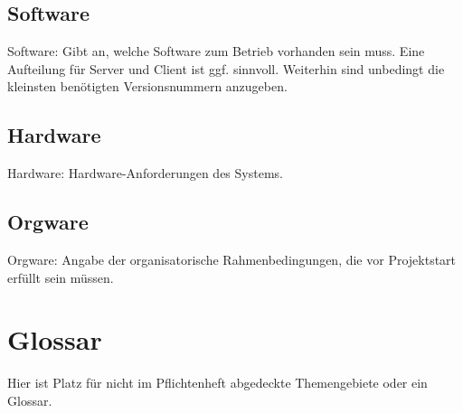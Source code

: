 \documentclass[a4paper]{scrreprt}
\begin{document}
\section{Software}
Software: Gibt an, welche Software zum Betrieb vorhanden sein muss. Eine
Aufteilung für Server und Client ist ggf. sinnvoll. Weiterhin sind unbedingt die
kleinsten benötigten Versionsnummern anzugeben.
 
\section{Hardware}
Hardware: Hardware-Anforderungen des Systems.
 
\section{Orgware}
Orgware: Angabe der organisatorische Rahmenbedingungen, die vor Projektstart
erfüllt sein müssen.
 
 
\chapter{Glossar}
Hier ist Platz für nicht im Pflichtenheft abgedeckte Themengebiete oder ein
Glossar.
 
\listoffigures
 
\end{document}
